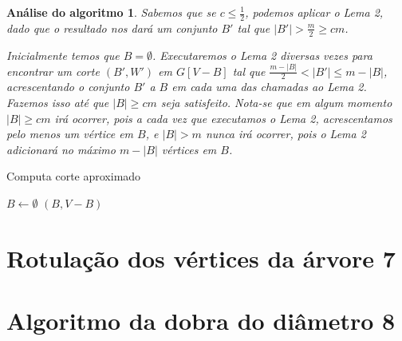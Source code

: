 \documentclass[a4paper,12pt]{article}
\newtheorem{alg}{Análise do algoritmo}
\begin{document}
\medskip

\begin{alg}
	
	Sabemos que se $c \le \frac{1}{2}$, podemos aplicar o Lema 2, 
	dado que o resultado nos dará um conjunto $B'$ tal que
	$|B'|>\frac{m}{2}\ge cm$.

	Inicialmente temos que $B = \emptyset$.
	Executaremos o Lema 2 diversas vezes para encontrar 
	um corte $(B',W')$ em $G[V-B]$ tal que $\frac{m-|B|}{2}<|B'|\le m-|B|$,
	acrescentando o conjunto $B'$ a $B$ em cada uma das chamadas ao Lema 2.
	Fazemos isso até que $|B|\ge cm$ seja satisfeito.
	Nota-se que em algum momento $|B|\ge cm$ irá ocorrer, pois a cada vez
	que executamos o Lema 2, acrescentamos pelo menos um vértice em $B$,
	e $|B|>m$ nunca irá ocorrer, pois o Lema 2 adicionará no máximo 
	$m-|B|$ vértices em $B$.

\end{alg}

\begin{algorithm}[H]

	\caption{Computa corte aproximado}
	$B \gets \emptyset$\;
	{
	}
	\Return $(B,V-B)$

\end{algorithm}	

\section {Rotulação dos vértices da árvore 7}


\section {Algoritmo da dobra do diâmetro 8}
\end{document}
